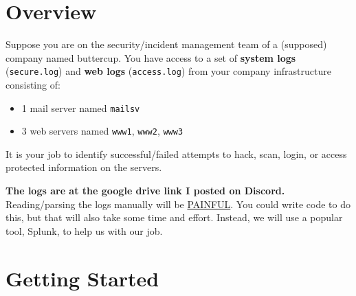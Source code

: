 \documentclass[a4paper, 10pt]{article}
\begin{document}
\subject
{}

\section*{Overview}

\par Suppose you are on the security/incident management team of a (supposed) company named buttercup.
You have access to a set of \textbf{system logs} (\texttt{secure.log})
and \textbf{web logs} (\texttt{access.log}) from your company infrastructure consisting of:
\begin{itemize}
	\item 1 mail server named \texttt{mailsv}
	\item 3 web servers named \texttt{www1}, \texttt{www2}, \texttt{www3}
\end{itemize}

\par It is your job to identify successful/failed attempts to hack, scan, login, or access protected information on the servers.

\par \textbf{The logs are at the google drive link I posted on Discord.}
Reading/parsing the logs manually will be \underline{PAINFUL}.
You could write code to do this, but that will also take some time and effort.
Instead, we will use a popular tool, Splunk, to help us with our job.

\section*{Getting Started}
\end{document}
